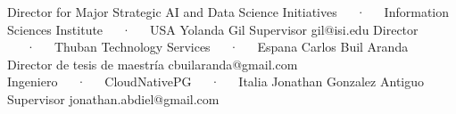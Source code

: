 \begin{cventries}
   \cventry
   {Director for Major Strategic AI and Data Science Initiatives~~~·~~~Information Sciences Institute~~~·~~~USA} %
   {Yolanda Gil} %
   {Supervisor} %
   {gil@isi.edu} %
   {} %
   {}
   \cventry
   {Director ~~~·~~~Thuban Technology Services~~~·~~~Espana} %
   {Carlos Buil Aranda} %
   {Director de tesis de maestría} %
   {cbuilaranda@gmail.com} %
   {} %
   {}
   \cventry
   {Ingeniero~~~·~~~CloudNativePG~~~·~~~Italia} %
   {Jonathan Gonzalez} %
   {Antiguo Supervisor} %
   {jonathan.abdiel@gmail.com} %
   {} %
\end{cventries}